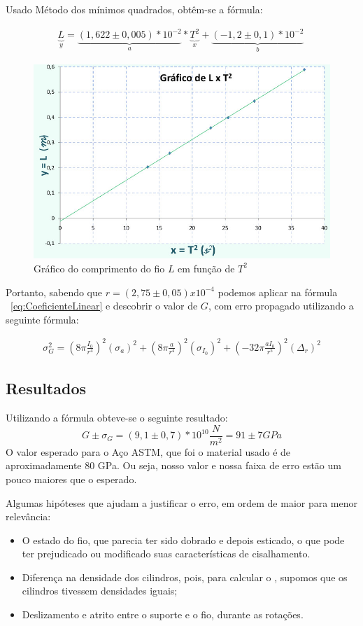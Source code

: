 \documentclass[a4paper]{article}
\begin{document}
Usado Método dos mínimos quadrados, obtêm-se a fórmula:

\begin{align}
	\underset{y}{\underbrace{L}} = \underset{a}{\underbrace{(1,622 \pm 0,005)* 10^{-2}}} * \underset{x}{\underbrace{T^2}} + \underset{b}{\underbrace{(-1,2\pm0,1)*10^{-2}}}\
\end{align}

\begin{figure}[!htbp]
	\centering
	\includegraphics[scale=0.4]{2.jpg}
	\caption{Gráfico do comprimento do fio $L$ em função de $T^2$}
	\label{fig:grafico1}
\end{figure}

Portanto, sabendo que $r = (2,75\pm0,05) x 10^{-4}$ podemos aplicar na fórmula ~\ref{eq:CoeficienteLinear} e descobrir o valor de $G$, com erro propagado utilizando a seguinte fórmula:

\begin{align}
	 \sigma_{G}^2 = (8 \pi \frac{I_0}{r^4})^2 (\sigma_a)^2 + (8 \pi \frac{a}{r^4})^2(\sigma_{I_0})^2 + (-32 \pi \frac{aI_0}{r^5})^2 (\Delta_r)^2 
\end{align}

\subsection{Resultados}
Utilizando a fórmula obteve-se o seguinte resultado:
$$G \pm \sigma_G = (9,1 \pm 0,7) * 10^{10} \frac{N}{m^2} = 91\pm7 GPa$$
O valor esperado para o Aço ASTM, que foi o material usado é de aproximadamente 80 GPa. Ou seja, nosso valor e nossa faixa de erro estão um pouco maiores que o esperado. 

Algumas hipóteses que ajudam a justificar o erro, em ordem de maior para menor relevância: 
\begin{itemize}
	\item O estado do fio, que parecia ter sido dobrado e depois esticado, o que pode ter prejudicado ou modificado suas características de cisalhamento.
	\item Diferença na densidade dos cilindros, pois, para calcular o , supomos que os cilindros tivessem densidades iguais;
	\item Deslizamento e atrito entre o suporte e o fio, durante as rotações.
\end{itemize}
\end{document}

